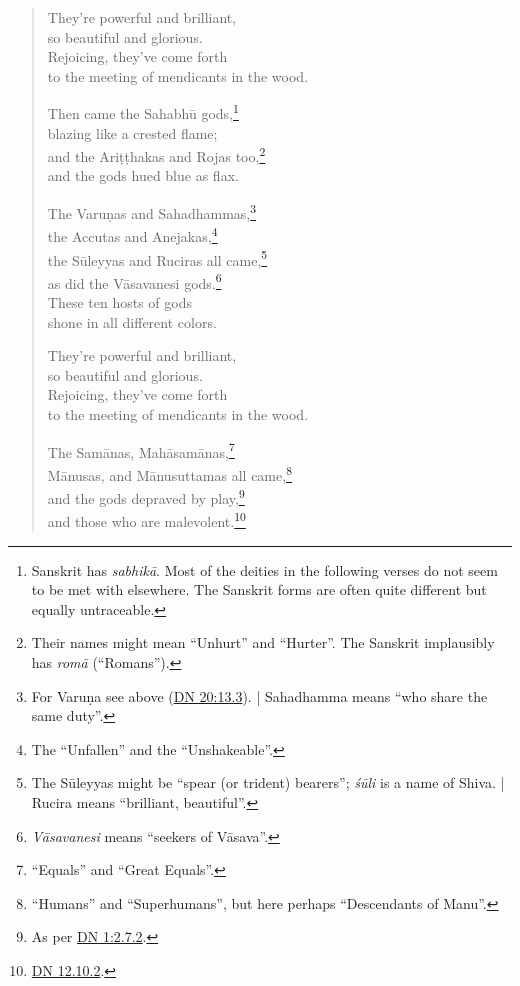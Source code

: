 \documentclass[12pt,openany]{book}%
\begin{document}
\begin{verse}
They’re powerful and brilliant, \\
so beautiful and glorious. \\
Rejoicing, they’ve come forth \\
to the meeting of mendicants in the wood. 

Then came the \textsanskrit{Sahabhū} gods,\footnote{Sanskrit has \textit{\textsanskrit{sabhikā}}. Most of the deities in the following verses do not seem to be met with elsewhere. The Sanskrit forms are often quite different but equally untraceable. } \\
blazing like a crested flame; \\
and the \textsanskrit{Ariṭṭhakas} and Rojas too,\footnote{Their names might mean “Unhurt” and “Hurter”. The Sanskrit implausibly has \textit{\textsanskrit{romā}} (“Romans”). } \\
and the gods hued blue as flax. 

The \textsanskrit{Varuṇas} and Sahadhammas,\footnote{For \textsanskrit{Varuṇa} see above (\href{https://suttacentral.net/dn20/en/sujato\#13.3}{DN 20:13.3}). | Sahadhamma means “who share the same duty”. } \\
the Accutas and Anejakas,\footnote{The “Unfallen” and the “Unshakeable”. } \\
the \textsanskrit{Sūleyyas} and Ruciras all came,\footnote{The \textsanskrit{Sūleyyas} might be “spear (or trident) bearers”; \textit{\textsanskrit{śūli}} is a name of Shiva. | Rucira means “brilliant, beautiful”. } \\
as did the \textsanskrit{Vāsavanesi} gods.\footnote{\textit{\textsanskrit{Vāsavanesi}} means “seekers of \textsanskrit{Vāsava}”. } \\
These ten hosts of gods \\
shone in all different colors. 

They’re powerful and brilliant, \\
so beautiful and glorious. \\
Rejoicing, they’ve come forth \\
to the meeting of mendicants in the wood. 

The \textsanskrit{Samānas}, \textsanskrit{Mahāsamānas},\footnote{“Equals” and “Great Equals”. } \\
\textsanskrit{Mānusas}, and \textsanskrit{Mānusuttamas} all came,\footnote{“Humans” and “Superhumans”, but here perhaps “Descendants of Manu”. } \\
and the gods depraved by play,\footnote{As per \href{https://suttacentral.net/dn1/en/sujato\#2.7.2}{DN 1:2.7.2}. } \\
and those who are malevolent.\footnote{\href{https://suttacentral.net/dn12.10.2/en/sujato}{DN 12.10.2}. } 


\end{verse}
\end{document}
